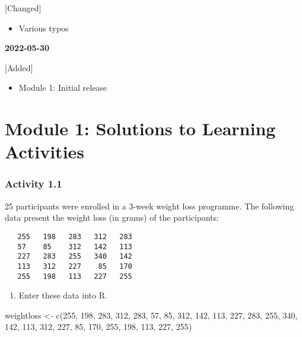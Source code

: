 \documentclass[
]{memoir}
\newenvironment{Shaded}{\begin{snugshade}}{\end{snugshade}}
\newcommand{\DecValTok}[1]{\textcolor[rgb]{0.00,0.00,0.81}{#1}}
\newcommand{\FunctionTok}[1]{\textcolor[rgb]{0.00,0.00,0.00}{#1}}
\newcommand{\NormalTok}[1]{#1}
\newcommand{\OtherTok}[1]{\textcolor[rgb]{0.56,0.35,0.01}{#1}}
\providecommand{\tightlist}{%
  \setlength{\itemsep}{0pt}\setlength{\parskip}{0pt}}
\begin{document}
{[}Changed{]}

\begin{itemize}
\tightlist
\item
  Various typos
\end{itemize}

\textbf{2022-05-30}

{[}Added{]}

\begin{itemize}
\tightlist
\item
  Module 1: Initial release
\end{itemize}

\hypertarget{module-1-solutions-to-learning-activities}{%
\chapter*{Module 1: Solutions to Learning Activities}\label{module-1-solutions-to-learning-activities}}

\hypertarget{activity-1.1}{%
\subsection*{Activity 1.1}\label{activity-1.1}}

25 participants were enrolled in a 3-week weight loss programme. The following data present the weight loss (in grams) of the participants:

\begin{verbatim}
   255   198   283   312   283
   57    85    312   142   113
   227   283   255   340   142
   113   312   227    85   170
   255   198   113   227   255
\end{verbatim}

\begin{enumerate}
\def\labelenumi{\alph{enumi})}
\tightlist
\item
  Enter these data into R.
\end{enumerate}

\begin{Shaded}
\begin{Highlighting}[]
\NormalTok{weightloss }\OtherTok{\textless{}{-}} \FunctionTok{c}\NormalTok{(}\DecValTok{255}\NormalTok{, }\DecValTok{198}\NormalTok{, }\DecValTok{283}\NormalTok{, }\DecValTok{312}\NormalTok{, }\DecValTok{283}\NormalTok{, }\DecValTok{57}\NormalTok{,  }\DecValTok{85}\NormalTok{, }\DecValTok{312}\NormalTok{, }\DecValTok{142}\NormalTok{, }\DecValTok{113}\NormalTok{,}
                \DecValTok{227}\NormalTok{, }\DecValTok{283}\NormalTok{, }\DecValTok{255}\NormalTok{, }\DecValTok{340}\NormalTok{, }\DecValTok{142}\NormalTok{, }\DecValTok{113}\NormalTok{, }\DecValTok{312}\NormalTok{, }\DecValTok{227}\NormalTok{,  }\DecValTok{85}\NormalTok{, }\DecValTok{170}\NormalTok{,}
                \DecValTok{255}\NormalTok{, }\DecValTok{198}\NormalTok{, }\DecValTok{113}\NormalTok{, }\DecValTok{227}\NormalTok{, }\DecValTok{255}\NormalTok{)}
\end{Highlighting}
\end{Shaded}
\end{document}
